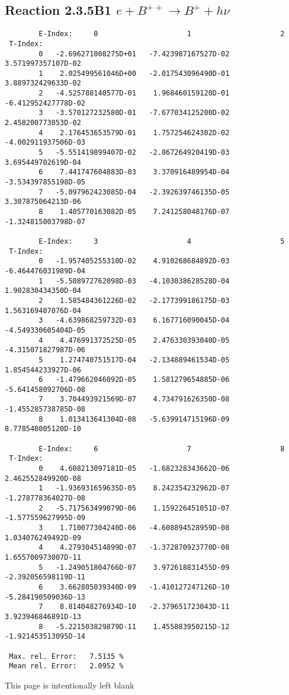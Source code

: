 \documentclass[12pt]{article}
\begin{document}
\subsection{
Reaction 2.3.5B1  $e + B^{++} \rightarrow B^+ + h\nu$
}

\begin{small}\begin{verbatim}
        E-Index:     0                     1                     2
 T-Index:
        0   -2.696271008275D+01   -7.423987167527D-02    3.571997357107D-02
        1    2.025499561046D+00   -2.017543096490D-01    3.889732429633D-02
        2   -4.525788140577D-01    1.968460159120D-01   -6.412952427778D-02
        3   -3.570127232580D-01   -7.677034125200D-02    2.458200773053D-02
        4    2.176453653579D-01    1.757254624302D-02   -4.002911937506D-03
        5   -5.551419899407D-02   -2.867264920419D-03    3.695449702619D-04
        6    7.441747604883D-03    3.370916489954D-04   -3.534397855198D-05
        7   -5.097962423085D-04   -2.392639746135D-05    3.307875064213D-06
        8    1.405770163082D-05    7.241258048176D-07   -1.324815003798D-07

        E-Index:     3                     4                     5
 T-Index:
        0   -1.957405255310D-02    4.910268684892D-03   -6.464476031989D-04
        1   -5.508972762098D-03   -4.103038628528D-04    1.902830434350D-04
        2    1.585484361226D-02   -2.177399186175D-03    1.563169407076D-04
        3   -4.639868259732D-03    6.167716090045D-04   -4.549330605404D-05
        4    4.476991372525D-05    2.476330393040D-05   -4.315071827987D-06
        5    1.274740751517D-04   -2.134889461534D-05    1.854544233927D-06
        6   -1.479662046092D-05    1.581279654885D-06   -5.641458092706D-08
        7    3.704493921569D-07    4.734791626350D-08   -1.455285738785D-08
        8    1.013413641304D-08   -5.639914715196D-09    8.778548005120D-10

        E-Index:     6                     7                     8
 T-Index:
        0    4.608213097181D-05   -1.682328343662D-06    2.462552849920D-08
        1   -1.936931659635D-05    8.242354232962D-07   -1.278778364027D-08
        2   -5.717563499079D-06    1.159226451051D-07   -1.577559627995D-09
        3    1.710077304240D-06   -4.608894528959D-08    1.034076249492D-09
        4    4.279304514899D-07   -1.372870923770D-08    1.655700973007D-11
        5   -1.249051804766D-07    3.972618831455D-09   -2.392056598119D-11
        6    3.662805039340D-09   -1.410127247126D-10   -5.284190509036D-13
        7    8.814048276934D-10   -2.379651723043D-11    3.923946846891D-13
        8   -5.221503829879D-11    1.455883950215D-12   -1.921453513095D-14

 Max. rel. Error:   7.5135 %
 Mean rel. Error:   2.0952 %

\end{verbatim}\end{small}
\newpage
This page is intentionally left blank
\newpage
\end{document}
